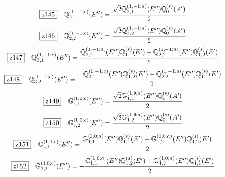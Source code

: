 \documentclass[fleqn,10pt,landscape]{jsarticle}
\begin{document}
\begin{dmath*}
\hspace*{3mm}\fbox{z145}\quad \mathbb{Q}_{2,1}^{(1,-1;c)}(E^{\prime\prime})=\frac{\sqrt{2} \mathbb{Q}_{2,1}^{(1,-1;a)}(E^{\prime\prime}) \mathbb{Q}_{0}^{(s)}(A^{\prime})}{2}
\end{dmath*}
\begin{dmath*}
\hspace*{3mm}\fbox{z146}\quad \mathbb{Q}_{2,2}^{(1,-1;c)}(E^{\prime\prime})=\frac{\sqrt{2} \mathbb{Q}_{2,2}^{(1,-1;a)}(E^{\prime\prime}) \mathbb{Q}_{0}^{(s)}(A^{\prime})}{2}
\end{dmath*}
\begin{dmath*}
\hspace*{3mm}\fbox{z147}\quad \mathbb{Q}_{3,1}^{(1,-1;c)}(E^{\prime\prime})=\frac{\mathbb{Q}_{2,1}^{(1,-1;a)}(E^{\prime\prime}) \mathbb{Q}_{1,1}^{(s)}(E^{\prime}) - \mathbb{Q}_{2,2}^{(1,-1;a)}(E^{\prime\prime}) \mathbb{Q}_{1,2}^{(s)}(E^{\prime})}{2}
\end{dmath*}
\begin{dmath*}
\hspace*{3mm}\fbox{z148}\quad \mathbb{Q}_{3,2}^{(1,-1;c)}(E^{\prime\prime})=- \frac{\mathbb{Q}_{2,1}^{(1,-1;a)}(E^{\prime\prime}) \mathbb{Q}_{1,2}^{(s)}(E^{\prime}) + \mathbb{Q}_{2,2}^{(1,-1;a)}(E^{\prime\prime}) \mathbb{Q}_{1,1}^{(s)}(E^{\prime})}{2}
\end{dmath*}
\begin{dmath*}
\hspace*{3mm}\fbox{z149}\quad \mathbb{G}_{1,1}^{(1,0;c)}(E^{\prime\prime})=\frac{\sqrt{2} \mathbb{G}_{1,1}^{(1,0;a)}(E^{\prime\prime}) \mathbb{Q}_{0}^{(s)}(A^{\prime})}{2}
\end{dmath*}
\begin{dmath*}
\hspace*{3mm}\fbox{z150}\quad \mathbb{G}_{1,2}^{(1,0;c)}(E^{\prime\prime})=\frac{\sqrt{2} \mathbb{G}_{1,2}^{(1,0;a)}(E^{\prime\prime}) \mathbb{Q}_{0}^{(s)}(A^{\prime})}{2}
\end{dmath*}
\begin{dmath*}
\hspace*{3mm}\fbox{z151}\quad \mathbb{G}_{2,1}^{(1,0;c)}(E^{\prime\prime})=\frac{\mathbb{G}_{1,1}^{(1,0;a)}(E^{\prime\prime}) \mathbb{Q}_{1,1}^{(s)}(E^{\prime}) - \mathbb{G}_{1,2}^{(1,0;a)}(E^{\prime\prime}) \mathbb{Q}_{1,2}^{(s)}(E^{\prime})}{2}
\end{dmath*}
\begin{dmath*}
\hspace*{3mm}\fbox{z152}\quad \mathbb{G}_{2,2}^{(1,0;c)}(E^{\prime\prime})=- \frac{\mathbb{G}_{1,1}^{(1,0;a)}(E^{\prime\prime}) \mathbb{Q}_{1,2}^{(s)}(E^{\prime}) + \mathbb{G}_{1,2}^{(1,0;a)}(E^{\prime\prime}) \mathbb{Q}_{1,1}^{(s)}(E^{\prime})}{2}
\end{dmath*}
\vspace{5mm}
\end{document}
